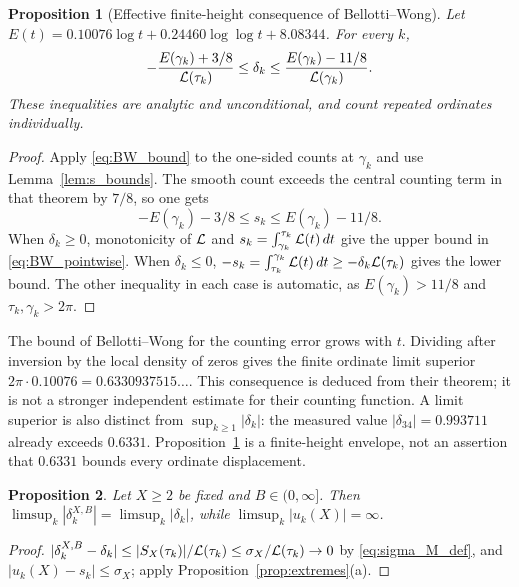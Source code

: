 \documentclass[11pt,reqno]{amsart}
\theoremstyle{plain}\newtheorem{theorem}{Theorem}[section]\newtheorem{proposition}[theorem]{Proposition}\newtheorem{lemma}[theorem]{Lemma}\newtheorem{corollary}[theorem]{Corollary}
\theoremstyle{definition}\newtheorem{hypothesis}[theorem]{Hypothesis}\newtheorem{definition}[theorem]{Definition}
\theoremstyle{remark}\newtheorem{remark}[theorem]{Remark}\newtheorem{experiment}[theorem]{Experiment}\newtheorem{question}[theorem]{Question}\newtheorem{heuristic}[theorem]{Heuristic}\newtheorem{conjecture}[theorem]{Conjecture}
\begin{document}
\begin{proposition}[Effective finite-height consequence of Bellotti--Wong]\label{prop:BW_pointwise}
Let $E(t)=0.10076\log t+0.24460\log\log t+8.08344$. For every $k$,
\begin{equation}
 -\frac{E(\gamma_k)+3/8}{\mathcal L(\tau_k)}
 \le\delta_k\le\frac{E(\gamma_k)-11/8}{\mathcal L(\gamma_k)}.
 \label{eq:BW_pointwise}
\end{equation}
These inequalities are analytic and unconditional, and count repeated ordinates individually.
\end{proposition}
\begin{proof}
Apply \eqref{eq:BW_bound} to the one-sided counts at $\gamma_k$ and use Lemma~\ref{lem:s_bounds}. The smooth count exceeds the central counting term in that theorem by $7/8$, so one gets
\begin{equation}
 -E(\gamma_k)-3/8\le s_k\le E(\gamma_k)-11/8.
 \label{eq:BW_ordinal_sandwich}
\end{equation}
When $\delta_k\ge0$, monotonicity of $\mathcal L$ and $s_k=\int_{\gamma_k}^{\tau_k}\mathcal L(t)\,dt$ give the upper bound in \eqref{eq:BW_pointwise}. When $\delta_k\le0$, $-s_k=\int_{\tau_k}^{\gamma_k}\mathcal L(t)\,dt\ge-\delta_k\mathcal L(\tau_k)$ gives the lower bound. The other inequality in each case is automatic, as $E(\gamma_k)>11/8$ and $\tau_k,\gamma_k>2\pi$.
\end{proof}
The bound of Bellotti--Wong for the counting error grows with $t$. Dividing after inversion by the local density of zeros gives the finite ordinate limit superior $2\pi\cdot0.10076=0.6330937515\ldots$. This consequence is deduced from their theorem; it is not a stronger independent estimate for their counting function. A limit superior is also distinct from $\sup_{k\ge1}|\delta_k|$: the measured value $|\delta_{34}|=0.993711$ already exceeds $0.6331$. Proposition~\ref{prop:BW_pointwise} is a finite-height envelope, not an assertion that $0.6331$ bounds every ordinate displacement.

\begin{proposition}\label{prop:fixed_sup}
Let $X\ge2$ be fixed and $B\in(0,\infty]$. Then $\limsup_k|\delta_k^{X,B}|=\limsup_k|\delta_k|$, while $\limsup_k|u_k(X)|=\infty$.
\end{proposition}

\begin{proof}
$|\delta_k^{X,B}-\delta_k|\le|S_X(\tau_k)|/\mathcal L(\tau_k)\le\sigma_X/\mathcal L(\tau_k)\to0$ by \eqref{eq:sigma_M_def}, and $|u_k(X)-s_k|\le\sigma_X$; apply Proposition~\ref{prop:extremes}(a).
\end{proof}
\end{document}
